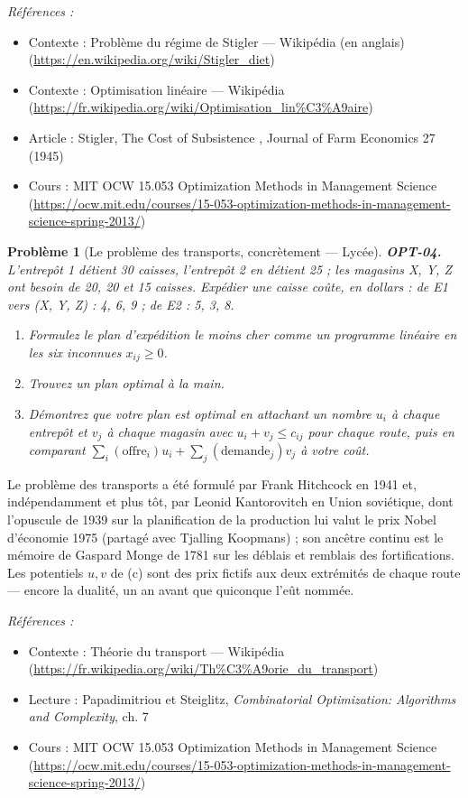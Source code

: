 \documentclass[11pt]{article}
\newtheorem{problem}{Problème}
\newenvironment{refs}{\par\small\noindent\emph{Références :}\begin{itemize}\setlength\itemsep{0pt}}{\end{itemize}\normalsize}
\begin{document}
\begin{refs}
\item Contexte : Problème du régime de Stigler --- Wikipédia (en anglais) (\url{https://en.wikipedia.org/wiki/Stigler_diet})
\item Contexte : Optimisation linéaire --- Wikipédia (\url{https://fr.wikipedia.org/wiki/Optimisation_lin%C3%A9aire})
\item Article : Stigler, \og{} The Cost of Subsistence \fg{}, Journal of Farm Economics 27 (1945)
\item Cours : MIT OCW 15.053 Optimization Methods in Management Science (\url{https://ocw.mit.edu/courses/15-053-optimization-methods-in-management-science-spring-2013/})
\end{refs}

\bigskip

\begin{problem}[{Le problème des transports, concrètement --- Lycée}]
\textbf{OPT-04.} L'entrepôt 1 détient 30 caisses, l'entrepôt 2 en détient 25 ; les magasins X, Y, Z ont besoin de 20, 20 et 15 caisses. Expédier une caisse coûte, en dollars : de E1 vers (X, Y, Z) : 4, 6, 9 ; de E2 : 5, 3, 8.
\begin{enumerate}
\item[(a)] Formulez le plan d'expédition le moins cher comme un programme linéaire en les six inconnues $x_{ij} \ge 0$.
\item[(b)] Trouvez un plan optimal à la main.
\item[(c)] Démontrez que votre plan est optimal en attachant un nombre $u_i$ à chaque entrepôt et $v_j$ à chaque magasin avec $u_i + v_j \le c_{ij}$ pour chaque route, puis en comparant $\sum_i (\text{offre}_i) u_i + \sum_j (\text{demande}_j) v_j$ à votre coût.
\end{enumerate}

\end{problem}

\noindent Le problème des transports a été formulé par Frank Hitchcock en 1941 et, indépendamment et plus tôt, par Leonid Kantorovitch en Union soviétique, dont l'opuscule de 1939 sur la planification de la production lui valut le prix Nobel d'économie 1975 (partagé avec Tjalling Koopmans) ; son ancêtre continu est le mémoire de Gaspard Monge de 1781 sur les déblais et remblais des fortifications. Les potentiels $u, v$ de (c) sont des prix fictifs aux deux extrémités de chaque route --- encore la dualité, un an avant que quiconque l'eût nommée.

\begin{refs}
\item Contexte : Théorie du transport --- Wikipédia (\url{https://fr.wikipedia.org/wiki/Th%C3%A9orie_du_transport})
\item Lecture : Papadimitriou et Steiglitz, \textit{Combinatorial Optimization: Algorithms and Complexity}, ch. 7
\item Cours : MIT OCW 15.053 Optimization Methods in Management Science (\url{https://ocw.mit.edu/courses/15-053-optimization-methods-in-management-science-spring-2013/})
\end{refs}
\end{document}
